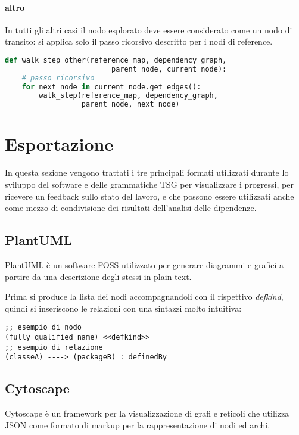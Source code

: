 \paragraph{altro}

In tutti gli altri casi il nodo esplorato deve essere considerato come un nodo di transito: si applica solo il passo ricorsivo descritto per i nodi di reference.

\begin{lstlisting}[language=Python, caption=pseudocodice]
def walk_step_other(reference_map, dependency_graph,
                         parent_node, current_node):
    # passo ricorsivo
    for next_node in current_node.get_edges():
        walk_step(reference_map, dependency_graph,
                  parent_node, next_node)
\end{lstlisting}

\section{Esportazione}

In questa sezione vengono trattati i tre principali formati utilizzati durante lo sviluppo del software e delle grammatiche TSG per visualizzare i progressi, per ricevere un feedback sullo stato del lavoro, e che possono essere utilizzati anche come mezzo di condivisione dei risultati dell'analisi delle dipendenze.

\subsection{PlantUML}

PlantUML \cite{PlantUML} \`e un software FOSS utilizzato per generare diagrammi e grafici a partire da una descrizione degli stessi in plain text.

Prima si produce la lista dei nodi accompagnandoli con il rispettivo \emph{defkind}, quindi si inseriscono le relazioni con una sintazzi molto intuitiva:

\begin{lstlisting}
;; esempio di nodo
(fully_qualified_name) <<defkind>>
;; esempio di relazione
(classeA) ----> (packageB) : definedBy
\end{lstlisting}

\subsection{Cytoscape}

Cytoscape \cite{CytoscapeJS} \`e un framework per la visualizzazione di grafi e reticoli che utilizza JSON come formato di markup per la rappresentazione di nodi ed archi.

